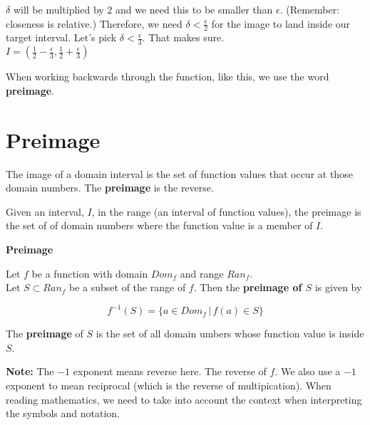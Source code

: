 \documentclass{ximera}
\begin{document}
$\delta$ will be multiplied by $2$ and we need this to be smaller than $\epsilon$.  (Remember: closeness is relative.) Therefore, we need $\delta < \frac{\epsilon}{2}$ for the image to land inside our target interval.  Let's pick $\delta < \frac{\epsilon}{3}$.  That makes sure. \\



$I = \left( \frac{1}{2} - \frac{\epsilon}{3}, \frac{1}{2} + \frac{\epsilon}{3} \right)$




When working backwards through the function, like this, we use the word \textbf{preimage}.



























\section{Preimage}




The image of a domain interval is the set of function values that occur at those domain numbers.  The \textbf{preimage} is the reverse.  

Given an interval, $I$, in the range (an interval of function values), the preimage is the set of of domain numbers where the function value is a member of $I$.





\begin{definition} \textbf{\textcolor{green!50!black}{Preimage}}

Let $f$ be a function with domain $Dom_f$ and range $Ran_f$. \\
Let $S \subset Ran_f$ be a subset of the range of $f$.  Then the \textbf{preimage of $S$} is given by

\[       f^{-1}(S) = \{   a \in Dom_f  \, | \, f(a) \in S  \}             \]



The \textbf{preimage} of $S$ is the set of all domain umbers whose function value is inside $S$.


\textbf{Note:}  The $-1$ exponent means reverse here. The reverse of $f$.  We also use a $-1$ exponent to mean reciprocal (which is the reverse of multipication).  When reading mathematics, we need to take into account the context when interpreting the symbols and notation.


\end{definition}
\end{document}
